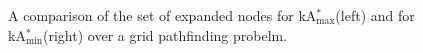 \documentclass[smallextended]{svjour3}       %
\newcommand{\kastar}{kA$^*$\xspace}
\newcommand{\kastarvar}[1]{\textup{kA}$^*_{#1}$\xspace}
\newcommand{\kastarmin}{\kastarvar{\min}}
\newcommand{\kastarmax}{\kastarvar{\max}}
\newcommand{\axiomcons}{consistent\xspace}
\begin{document}



\begin{figure}
    \centering
    \hfill
    \caption{A comparison of the set of expanded nodes for \kastarmax (left) and for \kastarmin (right) over a grid pathfinding probelm.}
    \label{fig:min-vs-max}
\end{figure}
\end{document}
